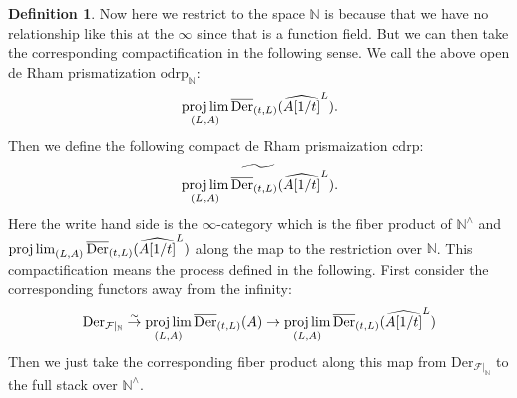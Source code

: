 \documentclass[12pt]{article}
\theoremstyle{definition}
\newtheorem{definition}{Definition}
\begin{document}
\begin{definition}
Now here we restrict to the space $\mathbb{N}$ is because that we have no relationship like this at the $\infty$ since that is a function field. But we can then take the corresponding compactification in the following sense. We call the above open de Rham prismatization $\mathrm{odrp}_\mathbb{N}$:
\begin{align}
\projlim_{(L,A)}\overline{\mathrm{Der}}_{(t,L)}(\widehat{A[1/t]}^{L}).
\end{align}
Then we define the following compact de Rham prismaization $\mathrm{cdrp}$:
\begin{align}
\widetilde{\projlim_{(L,A)}\overline{\mathrm{Der}}_{(t,L)}(\widehat{A[1/t]}^{L})}.
\end{align}
Here the write hand side is the $\infty$-category which is the fiber product of $\mathbb{N}^\wedge$ and $\projlim_{(L,A)}\overline{\mathrm{Der}}_{(t,L)}(\widehat{A[1/t]}^{L})$ along the map to the restriction over $\mathbb{N}$. 
This compactification means the process defined in the following. First consider the corresponding functors away from the infinity:
\begin{align}
\mathrm{Der}_{\mathcal{F}|_{\mathbb{N}}}\overset{\sim}{\rightarrow} \projlim_{(L,A)}\overline{\mathrm{Der}}_{(t,L)}(A) \overset{}{\rightarrow} \projlim_{(L,A)}\overline{\mathrm{Der}}_{(t,L)}(\widehat{A[1/t]}^L)
\end{align}
Then we just take the corresponding fiber product along this map from $\mathrm{Der}_{\mathcal{F}|_{\mathbb{N}}}$ to the full stack over $\mathbb{N}^\wedge$.
\end{definition}
\end{document}
